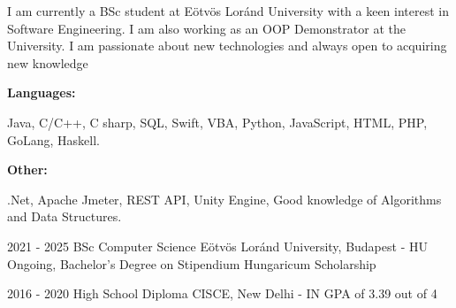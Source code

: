 \documentclass[9pt]{developercv} %
\begin{document}
\begin{minipage}[t]{0.46\textwidth}
	\vspace{-6pt}
 
	I am currently a BSc student at Eötvös Loránd University with a keen interest in Software Engineering. I am also working as an OOP Demonstrator at the University. I am passionate about new technologies and always open to acquiring new knowledge
\end{minipage}
\hfill %
\begin{minipage}[t]{0.465\textwidth}
    \vspace{-6pt}
    
    \begin{minipage}[t]{0.2\textwidth}
        \textbf{Languages:}
    \end{minipage}
    \hfill
    \begin{minipage}[t]{0.73\textwidth}
      Java, C/C++, C sharp, SQL, Swift, VBA, Python, JavaScript, HTML, PHP, GoLang, Haskell.  
    \end{minipage}
    \vspace{4mm}
    
    \begin{minipage}[t]{0.2\textwidth}
        \textbf{Other:}
    \end{minipage}
    \hfill
    \begin{minipage}[t]{0.73\textwidth}
    .Net, Apache Jmeter, REST API, Unity Engine, Good knowledge of Algorithms and Data Structures.
    \end{minipage}
    
\end{minipage}


\vspace{-10 pt}
\begin{entrylist}
    \entry
		{2021 - 2025}
		{BSc Computer Science }
		{Eötvös Loránd University, Budapest - HU}
		{Ongoing, Bachelor's Degree on Stipendium Hungaricum Scholarship}
  
  \entry
		{2016 - 2020}
		{High School Diploma}
		{CISCE, New Delhi - IN}
		{GPA of 3.39 out of 4}
\end{entrylist}
\end{document}
